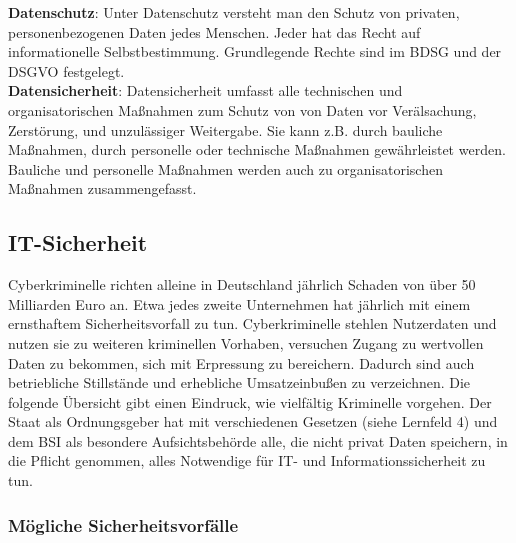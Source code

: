 \documentclass[a4paper, 12pt]{report}
\begin{document}
\textbf{Datenschutz}: Unter Datenschutz versteht man den Schutz von privaten, 
personenbezogenen Daten jedes Menschen. Jeder hat das Recht auf informationelle
Selbstbestimmung. Grundlegende Rechte sind im BDSG und der DSGVO festgelegt. \\

\textbf{Datensicherheit}: Datensicherheit umfasst alle technischen und 
organisatorischen Maßnahmen zum Schutz von von Daten vor Verälsachung, 
Zerstörung, und unzulässiger Weitergabe. Sie kann z.B. durch bauliche Maßnahmen, 
durch personelle oder technische Maßnahmen gewährleistet werden. Bauliche und 
personelle Maßnahmen werden auch zu organisatorischen Maßnahmen zusammengefasst. 

\subsection{IT-Sicherheit}

Cyberkriminelle richten alleine in Deutschland jährlich Schaden von über 50 
Milliarden Euro an. Etwa jedes zweite Unternehmen hat jährlich mit einem 
ernsthaftem Sicherheitsvorfall zu tun. Cyberkriminelle stehlen Nutzerdaten und 
nutzen sie zu weiteren kriminellen Vorhaben, versuchen Zugang zu wertvollen 
Daten zu bekommen, sich mit Erpressung zu bereichern. Dadurch sind auch 
betriebliche Stillstände und erhebliche Umsatzeinbußen zu verzeichnen. Die 
folgende Übersicht gibt einen Eindruck, wie vielfältig Kriminelle vorgehen. Der 
Staat als Ordnungsgeber hat mit verschiedenen Gesetzen (siehe Lernfeld 4) und 
dem BSI als besondere Aufsichtsbehörde alle, die nicht privat Daten speichern, 
in die Pflicht genommen, alles Notwendige für IT- und Informationssicherheit zu
tun. 

\subsubsection{Mögliche Sicherheitsvorfälle}
\end{document}
